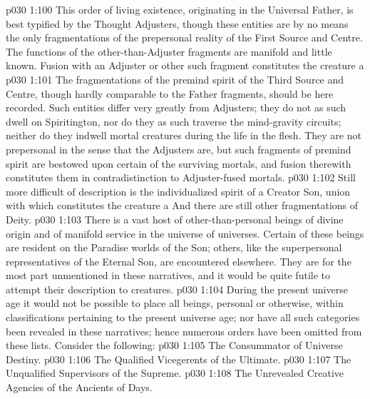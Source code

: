 \vs p030 1:100 \bibnobreakspace {} This order of living existence, originating in the Universal Father, is best typified by the Thought Adjusters, though these entities are by no means the only fragmentations of the prepersonal reality of the First Source and Centre. The functions of the other\hyp{}than\hyp{}Adjuster fragments are manifold and little known. Fusion with an Adjuster or other such fragment constitutes the creature a 
\vs p030 1:101 The fragmentations of the premind spirit of the Third Source and Centre, though hardly comparable to the Father fragments, should be here recorded. Such entities differ very greatly from Adjusters; they do not as such dwell on Spiritington, nor do they as such traverse the mind\hyp{}gravity circuits; neither do they indwell mortal creatures during the life in the flesh. They are not prepersonal in the sense that the Adjusters are, but such fragments of premind spirit are bestowed upon certain of the surviving mortals, and fusion therewith constitutes them  in contradistinction to Adjuster\hyp{}fused mortals.
\vs p030 1:102 Still more difficult of description is the individualized spirit of a Creator Son, union with which constitutes the creature a  And there are still other fragmentations of Deity.
\vs p030 1:103 \bibnobreakspace {} There is a vast host of other\hyp{}than\hyp{}personal beings of divine origin and of manifold service in the universe of universes. Certain of these beings are resident on the Paradise worlds of the Son; others, like the superpersonal representatives of the Eternal Son, are encountered elsewhere. They are for the most part unmentioned in these narratives, and it would be quite futile to attempt their description to  creatures.
\vs p030 1:104 \bibnobreakspace{}  During the present universe age it would not be possible to place all beings, personal or otherwise, within classifications pertaining to the present universe age; nor have all such categories been revealed in these narratives; hence numerous orders have been omitted from these lists. Consider the following:
\vs p030 1:105 The Consummator of Universe Destiny.
\vs p030 1:106 The Qualified Vicegerents of the Ultimate.
\vs p030 1:107 The Unqualified Supervisors of the Supreme.
\vs p030 1:108 The Unrevealed Creative Agencies of the Ancients of Days.
